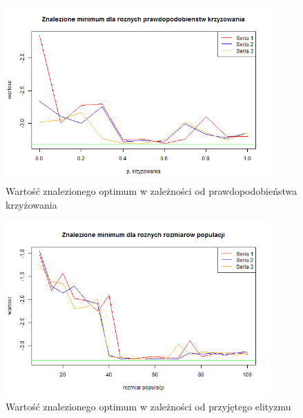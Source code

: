 \documentclass[11pt, a4paper]{article}
\begin{document}
\begin{figure}[H]
	\begin{center}
		\includegraphics[width=0.9\textwidth]{./assets/Hartman63.png} %
		\caption{Wartość znalezionego optimum w zależności od prawdopodobieństwa krzyżowania}
		\label{fig:hartman63}
	\end{center}
\end{figure}

\begin{figure}[H]
	\begin{center}
		\includegraphics[width=0.9\textwidth]{./assets/Hartman64.png} %
		\caption{Wartość znalezionego optimum w zależności od przyjętego elityzmu}
		\label{fig:hartman64}
	\end{center}
\end{figure}
\end{document}
